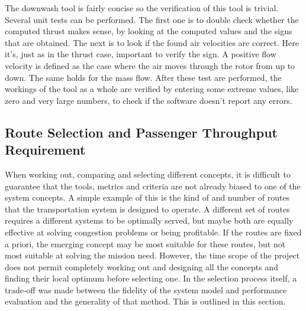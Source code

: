 The downwash tool is fairly concise so the verification of this tool is trivial. Several unit tests can be performed. The first one is to double check whether the computed thrust makes sense, by looking at the computed values and the signs that are obtained. The next is to look if the found air velocities are correct. Here it's, just as in the thrust case, important to verify the sign. A positive flow velocity is defined as the case where the air moves through the rotor from up to down. The same holds for the mass flow. After these test are performed, the workings of the tool as a whole are verified by entering some extreme values, like zero and very large numbers, to check if the software doesn't report any errors.   

\subsection{Route Selection and Passenger Throughput Requirement} \label{subsec:routeselection}

When working out, comparing and selecting different concepts, it is difficult to guarantee that the tools, metrics and criteria are not already biased to one of the system concepts. A simple example of this is the kind of and number of routes that the transportation system is designed to operate. A different set of routes requires a different systems to be optimally served, but maybe both are equally effective at solving congestion problems or being profitable. If the routes are fixed a priori, the emerging concept may be most suitable for these routes, but not most suitable at solving the mission need. However, the time scope of the project does not permit completely working out and designing all the concepts and finding their local optimum before selecting one. In the selection process itself, a trade-off was made between the fidelity of the system model and performance evaluation and the generality of that method. This is outlined in this section.


